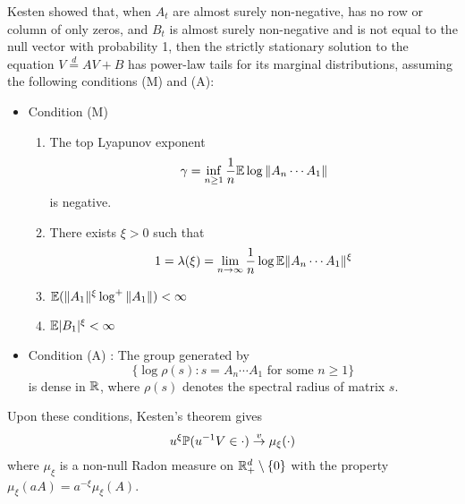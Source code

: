 Kesten \cite{kesten:1973} showed that, when $A_t$ are almost
surely non-negative, has no row or column of only zeros, and
$B_t$ is almost surely non-negative and is not equal to the null
vector with probability 1, then the strictly stationary solution to
the equation $V \overset{d}{=} A V + B$ has power-law tails
for its marginal distributions, assuming the following conditions (M)
and (A):
\begin{itemize}
\item Condition (M)
  \begin{enumerate}
  \item The top Lyapunov exponent
    \[
    \gamma = \inf_{n \geq 1} {1 \over n}\E \log \|A_n \cdots A_1\|
    \]
    is negative.
  \item There exists $\xi > 0$ such that
    \[
    1 = \lambda(\xi) = \lim_{n \to \infty} {1 \over n} \log \E \|A_n \cdots A_1\|^\xi
    \]
  \item $\E (\|A_1\|^\xi \log^+\|A_1\|) < \infty$
  \item $\E |B_1|^\xi < \infty$
  \end{enumerate}
\item Condition (A) : The group generated by
  \[
  \{\log\rho(s): s = A_n \cdots A_1 \text{ for some } n \geq 1\}
  \]
  is dense in $\reals$, where $\rho(s)$ denotes the spectral
  radius of matrix $s$.
\end{itemize}
Upon these conditions, Kesten's theorem gives
\begin{equation*}
  u^\xi \P(u^{-1} V \in \cdot) \overset{v}{\to} \mu_\xi(\cdot)
\end{equation*}
where $\mu_\xi$ is a non-null Radon measure on
$\reals^d_+ \setminus \{0\}$ with the property
$\mu_\xi(a A) = a^{-\xi} \mu_\xi(A)$.


